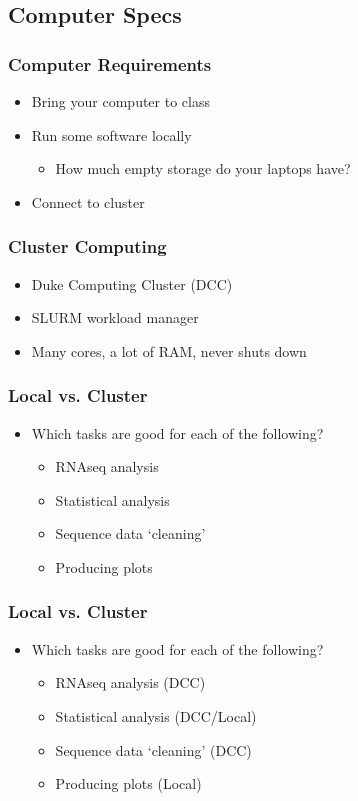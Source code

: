 \documentclass[14pt]{beamer}
\begin{document}
\subsection{Computer Specs}

\begin{frame}
\frametitle{Computer Requirements}
\begin{itemize}
	\item Bring your computer to class
	\item Run some software locally
	\begin{itemize}
		\item How much empty storage do your laptops have?
	\end{itemize}
	\item Connect to cluster
\end{itemize}
\end{frame}

\begin{frame}
\frametitle{Cluster Computing}
\begin{itemize}
	\item Duke Computing Cluster (DCC)
	\item SLURM workload manager
	\item Many cores, a lot of RAM, never shuts down
\end{itemize}
\end{frame}

\begin{frame}
\frametitle{Local vs. Cluster}
\begin{itemize}
	\item Which tasks are good for each of the following?
	\begin{itemize}
	\item<+-> RNAseq analysis 
	\item<+-> Statistical analysis 
	\item<+-> Sequence data `cleaning' 
	\item<+-> Producing plots 
	\end{itemize}
\end{itemize}
\end{frame}

\begin{frame}
\frametitle{Local vs. Cluster}
\begin{itemize}
	\item Which tasks are good for each of the following?
	\begin{itemize}
	\item RNAseq analysis (DCC)
	\item Statistical analysis (DCC/Local)
	\item Sequence data `cleaning' (DCC)
	\item Producing plots (Local)
	\end{itemize}
\end{itemize}
\end{frame}
\end{document}
